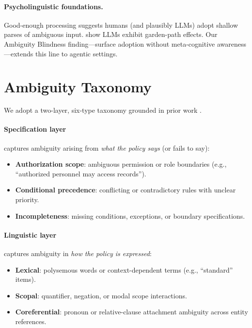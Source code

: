 \documentclass[11pt,a4paper]{article}
\begin{document}
\paragraph{Psycholinguistic foundations.}
Good-enough processing \citep{ferreira2002good} suggests humans (and plausibly LLMs) adopt shallow parses of ambiguous input.
\citet{li2024llmgardenpath} show LLMs exhibit garden-path effects.
Our Ambiguity Blindness finding---surface adoption without meta-cognitive awareness---extends this line to agentic settings.

\section{Ambiguity Taxonomy}

We adopt a two-layer, six-type taxonomy grounded in prior work \citep{massey2014evaluating, li2024drip}.

\paragraph{Specification layer} captures ambiguity arising from \emph{what the policy says} (or fails to say):
\begin{itemize}[leftmargin=*,itemsep=1pt]
\item \textbf{Authorization scope}: ambiguous permission or role boundaries (e.g., ``authorized personnel may access records'').
\item \textbf{Conditional precedence}: conflicting or contradictory rules with unclear priority.
\item \textbf{Incompleteness}: missing conditions, exceptions, or boundary specifications.
\end{itemize}

\paragraph{Linguistic layer} captures ambiguity in \emph{how the policy is expressed}:
\begin{itemize}[leftmargin=*,itemsep=1pt]
\item \textbf{Lexical}: polysemous words or context-dependent terms (e.g., ``standard'' items).
\item \textbf{Scopal}: quantifier, negation, or modal scope interactions.
\item \textbf{Coreferential}: pronoun or relative-clause attachment ambiguity across entity references.
\end{itemize}
\end{document}
